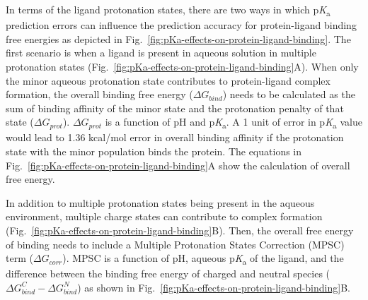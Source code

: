 \documentclass[9pt,lineno,final]{elife}
\newcommand{\pKa}{p\textit{K}\textsubscript{a}}
\begin{document}
In terms of the ligand protonation states, there are two ways in which \pKa{} prediction errors can influence the prediction accuracy for protein-ligand binding free energies as depicted in Fig.~\ref{fig:pKa-effects-on-protein-ligand-binding}. The first scenario is when a ligand is present in aqueous solution in multiple protonation states (Fig.~\ref{fig:pKa-effects-on-protein-ligand-binding}A).
When only the minor aqueous protonation state contributes to protein-ligand complex formation, the overall binding free energy ($\Delta G_{bind}$) needs to be calculated as the sum of binding affinity of the minor state and the protonation penalty of that state ($\Delta G_{prot}$). 
$\Delta G_{prot}$ is a function of pH and \pKa{}.
A 1 unit of error in \pKa{} value would lead to 1.36 kcal/mol error in overall binding affinity if the protonation state with the minor population binds the protein. 
The equations in Fig.~\ref{fig:pKa-effects-on-protein-ligand-binding}A show the calculation of overall free energy.



In addition to multiple protonation states being present in the aqueous environment, multiple charge states can contribute to complex formation (Fig.~\ref{fig:pKa-effects-on-protein-ligand-binding}B). Then, the overall free energy of binding needs to include a Multiple Protonation States Correction (MPSC) term ($\Delta G_{corr}$). MPSC is a function of pH, aqueous \pKa{} of the ligand, and the difference between the binding free energy of charged and neutral species ($\Delta G_{bind}^{C} - \Delta G_{bind}^{N}$) as shown in Fig.~\ref{fig:pKa-effects-on-protein-ligand-binding}B.



\end{document}
